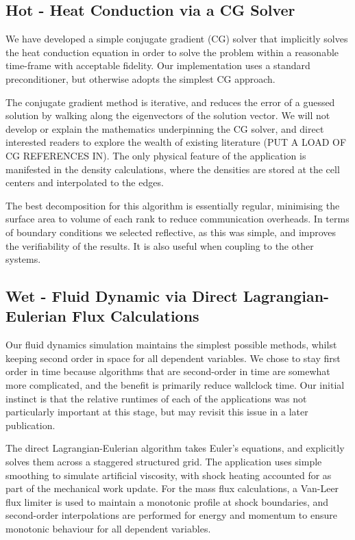 \documentclass[runningheads,a4paper]{llncs}
\begin{document}
\subsection{Hot - Heat Conduction via a CG Solver}

We have developed a simple conjugate gradient (CG) solver that implicitly solves the heat conduction equation in order to solve the problem within a reasonable time-frame with acceptable fidelity. Our implementation uses a standard preconditioner, but otherwise adopts the simplest CG approach. 

The conjugate gradient method is iterative, and reduces the error of a guessed solution by walking along the eigenvectors of the solution vector. We will not develop or explain the mathematics underpinning the CG solver, and direct interested readers to explore the wealth of existing literature \cite{} (PUT A LOAD OF CG REFERENCES IN). The only physical feature of the application is manifested in the density calculations, where the densities are stored at the cell centers and interpolated to the edges.

The best decomposition for this algorithm is essentially regular, minimising the surface area to volume of each rank to reduce communication overheads. In terms of boundary conditions we selected reflective, as this was simple, and improves the verifiability of the results. It is also useful when coupling to the other systems.

\subsection{Wet - Fluid Dynamic via Direct Lagrangian-Eulerian Flux Calculations}

Our fluid dynamics simulation maintains the simplest possible methods, whilst keeping second order in space for all dependent variables. We chose to stay first order in time because algorithms that are second-order in time are somewhat more complicated, and the benefit is primarily reduce wallclock time. Our initial instinct is that the relative runtimes of each of the applications was not particularly important at this stage, but may revisit this issue in a later publication.

The direct Lagrangian-Eulerian algorithm takes Euler's equations, and explicitly solves them across a staggered structured grid. The application uses simple smoothing to simulate artificial viscosity, with shock heating accounted for as part of the mechanical work update. For the mass flux calculations, a Van-Leer flux limiter is used to maintain a monotonic profile at shock boundaries, and second-order interpolations are performed for energy and momentum to ensure monotonic behaviour for all dependent variables.
\end{document}
